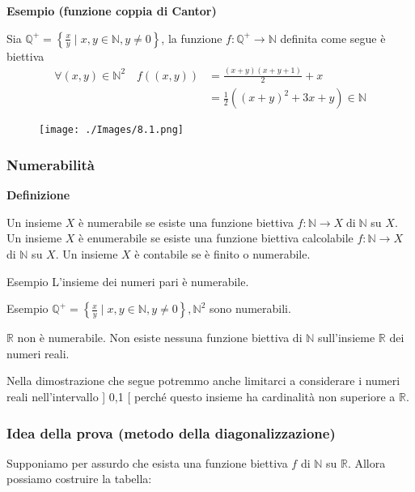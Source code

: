 \vspace{5mm}

\textbf{Esempio (funzione coppia di Cantor)}

Sia $\mathbb{Q}^{+}=\left\{\frac{x}{y} \mid x, y \in \mathbb{N}, y \neq 0\right\}$, la funzione $f: \mathbb{Q}^{+} \rightarrow \mathbb{N}$ definita come segue è biettiva
$$
\begin{aligned}
\forall(x, y) \in \mathbb{N}^{2} \quad f((x, y)) &=\frac{(x+y)(x+y+1)}{2}+x \\
&=\frac{1}{2}\left((x+y)^{2}+3 x+y\right) \in \mathbb{N}
\end{aligned}
$$

\begin{figure}[hbpt!]
    \centering
    \texttt{[image: ./Images/8.1.png]}
\end{figure}
\FloatBarrier

\subsubsection{Numerabilità}

\textbf{Definizione}

Un insieme $X$ è numerabile se esiste una funzione biettiva $f: \mathbb{N} \rightarrow X \operatorname{di} \mathbb{N}$ su $X .$
Un insieme $X$ è enumerabile se esiste una funzione biettiva calcolabile $f: \mathbb{N} \rightarrow X$ di $\mathbb{N}$ su $X$.
Un insieme $X$ è contabile se è finito o numerabile.


Esempio L'insieme dei numeri pari è numerabile.

Esempio $\mathbb{Q}^{+}=\left\{\frac{x}{y} \mid x, y \in \mathbb{N}, y \neq 0\right\}, \mathbb{N}^{2}$ sono numerabili.

\vspace{5mm}

$\mathbb{R}$ non è numerabile.
Non esiste nessuna funzione biettiva di $\mathbb{N}$ sull'insieme $\mathbb{R}$ dei numeri reali.

Nella dimostrazione che segue potremmo anche limitarci a considerare i numeri reali nell'intervallo ] 0,1 [ perché questo insieme ha cardinalità non superiore a $\mathbb{R}$.


\subsubsection{Idea della prova (metodo della diagonalizzazione)} 
Supponiamo per assurdo che esista una funzione biettiva $f$ di $\mathbb{N}$ su $\mathbb{R}$. Allora possiamo costruire la tabella:

